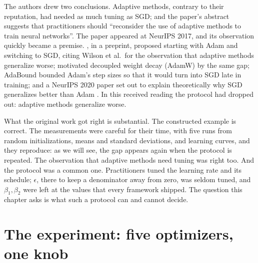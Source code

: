 \begin{refsection}
The authors drew two conclusions. Adaptive methods, contrary to their reputation, had needed as much tuning as SGD; and the paper's abstract suggests that practitioners should \enquote{reconsider the use of adaptive methods to train neural networks}. The paper appeared at NeurIPS 2017, and its observation quickly became a premise. \Textcite{KeskarSocher2017}, in a preprint, proposed starting with Adam and switching to SGD, citing Wilson et al.\ for the observation that adaptive methods generalize worse; \textcite{LoshchilovHutter2019} motivated decoupled weight decay (AdamW) by the same gap; AdaBound \parencite{LuoEtAl2019} bounded Adam's step sizes so that it would turn into SGD late in training; and a NeurIPS 2020 paper set out to explain theoretically why SGD generalizes better than Adam \parencite{ZhouEtAl2020}. In this received reading the protocol had dropped out: adaptive methods generalize worse.

What the original work got right is substantial. The constructed example is correct. The measurements were careful for their time, with five runs from random initializations, means and standard deviations, and learning curves, and they reproduce: as we will see, the gap appears again when the protocol is repeated. The observation that adaptive methods need tuning was right too. And the protocol was a common one. Practitioners tuned the learning rate and its schedule; $\epsilon$, there to keep a denominator away from zero, was seldom tuned, and $\beta_1,\beta_2$ were left at the values that every framework shipped. The question this chapter asks is what such a protocol can and cannot decide.

\section{The experiment: five optimizers, one knob}\label{sec:budgets:experiment}


\end{refsection}
